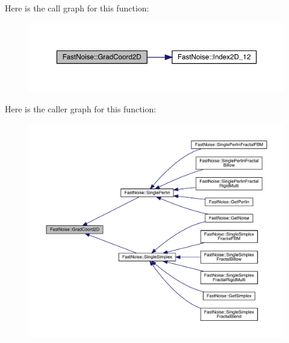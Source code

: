 Here is the call graph for this function\+:
\nopagebreak
\begin{figure}[H]
\begin{center}
\leavevmode
\includegraphics[width=350pt]{class_fast_noise_ad264b1bd7c819f7d5d9b5d5695a140a8_cgraph}
\end{center}
\end{figure}
Here is the caller graph for this function\+:
\nopagebreak
\begin{figure}[H]
\begin{center}
\leavevmode
\includegraphics[width=350pt]{class_fast_noise_ad264b1bd7c819f7d5d9b5d5695a140a8_icgraph}
\end{center}
\end{figure}
\mbox{\label{class_fast_noise_a96bc7b4cc9a84cec68c16bf6dfce4f53}} 
